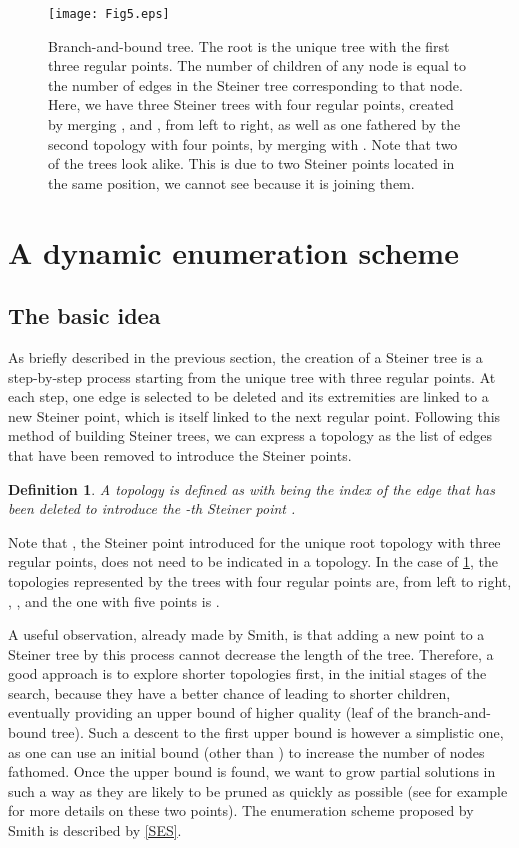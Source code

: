 \documentclass{article}
\theoremstyle{plain}
\newtheorem{definition}[theorem]{Definition}
\begin{document}
\begin{figure}
\centering
\texttt{[image: Fig5.eps]} 
\caption{\mbox{Branch-and-bound} tree. The root is the unique tree with the first three regular points. The number of children of any node is equal to the number of edges in the Steiner tree corresponding to that node. Here, we have three Steiner trees with four regular points, created by merging ,  and , from left to right, as well as one fathered by the second topology with four points, by merging with . Note that two of the trees look alike. This is due to two Steiner points located in the same position, we cannot see  because it is joining them.   \label{bbtree}}
\end{figure}













\section{A dynamic enumeration scheme}
\label{sec:scheme}
\subsection{The basic idea}
As briefly described in the previous section, the creation of a Steiner tree is a step-by-step process starting from the unique tree with three regular points. 
At each step, one edge is selected to be deleted and its extremities are linked to a new Steiner point, which is itself linked to the next regular point. 
Following this method of building Steiner trees, we can express a topology as the list of edges that have been removed to introduce the Steiner points. 
\begin{definition}
A topology is defined as  with  being the index of the edge that has been deleted to introduce the -th Steiner point . 
\end{definition}
Note that , the Steiner point introduced for the unique root topology with three regular points, does not need to be indicated in a topology. 
In the case of \cref{bbtree}, the topologies represented by the trees with four regular points are, from left to right, , ,  and the one with five points is . 

A useful observation, already made by Smith, is that adding a new point to a Steiner tree by this process cannot decrease the length of the tree. 
Therefore, a good approach is to explore shorter topologies first, in the initial stages of the search, because they have a better chance of leading to shorter children, eventually providing an upper bound of higher quality (leaf of the branch-and-bound tree). 
Such a descent to the first upper bound is however a simplistic one, as one can use an initial bound (other than ) to increase the number of nodes fathomed. 
Once the upper bound is found, we want to grow partial solutions in such a way as they are likely to be pruned as quickly as possible (see for example \cite{Fonseca} for more details on these two points).
The enumeration scheme proposed by Smith is described by \cref{SES}. 
\end{document}
